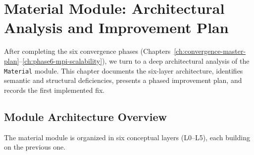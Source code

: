 
\chapter{Material Module: Architectural Analysis and Improvement Plan}
\label{ch:material-arch-improvements}

After completing the six convergence phases (Chapters~\ref{ch:convergence-master-plan}--\ref{ch:phase6-mpi-scalability}), we turn to a deep architectural analysis of the \texttt{Material} module.
This chapter documents the six-layer architecture, identifies semantic and structural deficiencies, presents a phased improvement plan, and records the first implemented fix.


\section{Module Architecture Overview}
\label{sec:mat-arch-overview}

The material module is organized in six conceptual layers (L0--L5),
each building on the previous one.

